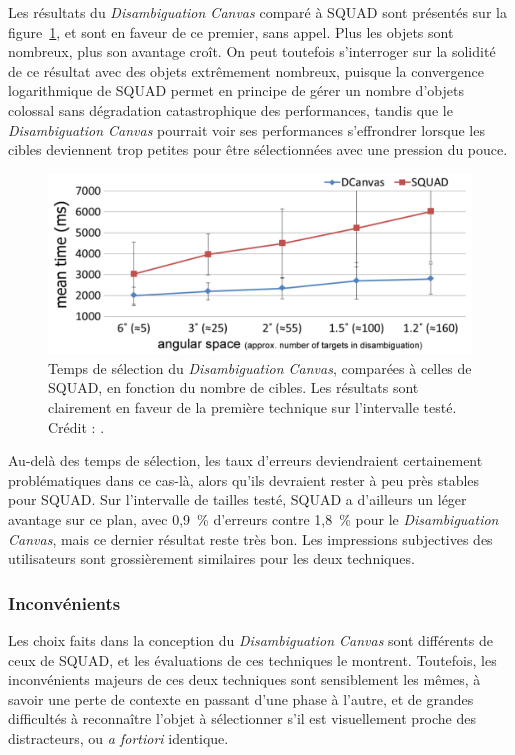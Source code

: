 	Les résultats du \emph{Disambiguation Canvas} comparé à SQUAD sont présentés sur la figure~\ref{fig:dCanvasSPerf}, et sont en faveur de ce premier, sans appel. Plus les objets sont nombreux, plus son avantage croît. On peut toutefois s'interroger sur la solidité de ce résultat avec des objets extrêmement nombreux, puisque la convergence logarithmique de SQUAD permet en principe de gérer un nombre d'objets colossal sans dégradation catastrophique des performances, tandis que le \emph{Disambiguation Canvas} pourrait voir ses performances s'effrondrer lorsque les cibles deviennent trop petites pour être sélectionnées avec une pression du pouce.	
	
	\begin{figure}[H]
		\centering
		\includegraphics[width=\textwidth]{figures/ch2/dCanvasSPerf}
		\caption[\emph{Disambiguation Canvas} -- performances II]{Temps de sélection du \emph{Disambiguation Canvas}, comparées à celles de SQUAD, en fonction du nombre de cibles. Les résultats sont clairement en faveur de la première technique sur l'intervalle testé. Crédit : \cite{debarba2013disambiguation}.}
		\label{fig:dCanvasSPerf}
	\end{figure}
	
	Au-delà des temps de sélection, les taux d'erreurs deviendraient certainement problématiques dans ce cas-là, alors qu'ils devraient rester à peu près stables pour SQUAD. Sur l'intervalle de tailles testé, SQUAD a d'ailleurs un léger avantage sur ce plan, avec 0,9~\%{} d'erreurs contre 1,8~\%{} pour le \emph{Disambiguation Canvas}, mais ce dernier résultat reste très bon. Les impressions subjectives des utilisateurs sont grossièrement similaires pour les deux techniques.
		 
	\subsubsection{Inconvénients}
	Les choix faits dans la conception du \emph{Disambiguation Canvas} sont différents de ceux de SQUAD, et les évaluations de ces techniques le montrent. Toutefois, les inconvénients majeurs de ces deux techniques sont sensiblement les mêmes, à savoir une perte de contexte en passant d'une phase à l'autre, et de grandes difficultés à reconnaître l'objet à sélectionner s'il est visuellement proche des distracteurs, ou \emph{a fortiori} identique.
	
